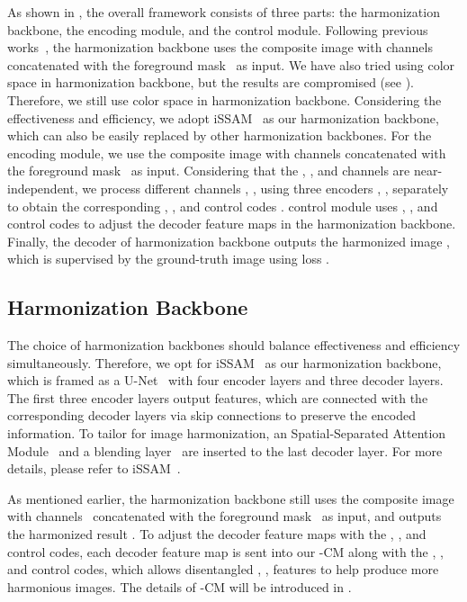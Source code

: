 \documentclass[sigconf]{acmart}
\begin{document}
As shown in , the overall framework consists of three parts: the harmonization backbone, the  encoding module, and the  control module. 
Following previous works~\cite{issam, ssam}, the harmonization backbone uses the composite image with  channels~ concatenated with the foreground mask~ as input. We have also tried using  color space in harmonization backbone, but the results are compromised (see ). Therefore, we still use  color space in harmonization backbone.
Considering the effectiveness and efficiency, we adopt iSSAM~\cite{issam} as our harmonization backbone, which can also be easily replaced by other harmonization backbones.
For the  encoding module, we use the composite image with  channels  concatenated with the foreground mask~ as input. 
Considering that the , , and  channels are near-independent, we process different channels , ,  using three encoders , ,  separately to obtain the corresponding , , and  control codes .
 control module uses , , and  control codes to adjust the decoder feature maps in the harmonization backbone. 
Finally, the decoder of harmonization backbone outputs the harmonized image , which is supervised by the ground-truth image  using  loss . 

\subsection{Harmonization Backbone}\label{Backbone Network}

The choice of harmonization backbones should balance effectiveness and efficiency simultaneously.
Therefore, we opt for iSSAM~\cite{issam} as our harmonization backbone, which is framed as a U-Net~\cite{ronneberger2015u} with four encoder layers and three decoder layers.
The first three encoder layers output features, which are connected with the corresponding decoder layers via skip connections to preserve the encoded information.
To tailor for image harmonization, an Spatial-Separated Attention Module~\cite{ssam} and a blending layer~\cite{issam} are inserted to the last decoder layer. For more details, please refer to iSSAM~\cite{issam}.  

As mentioned earlier, the harmonization backbone still uses the composite image with  channels~ concatenated with the foreground mask~ as input, and outputs the harmonized result .
To adjust the decoder feature maps with the , , and  control codes, each decoder feature map is sent into our -CM along with the , , and  control codes, which allows disentangled , ,  features to help produce more harmonious images. 
The details of -CM will be introduced in .
\end{document}
